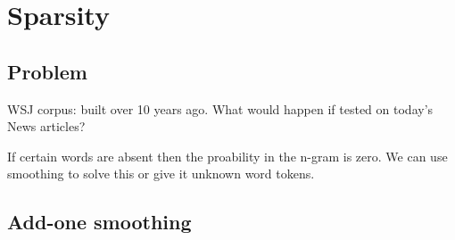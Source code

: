 \documentclass[11pt]{article}
\begin{document}


\tableofcontents

\clearpage

\section{Sparsity}

\subsection{Problem}

WSJ corpus: built over 10 years ago. What would happen if tested on today’s News articles?

If certain words are absent then the proability in the n-gram is zero. We can use smoothing to solve this or give it unknown word tokens. 

\subsection{Add-one smoothing}
\end{document}
